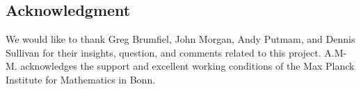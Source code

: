 
\subsection*{Acknowledgment}

We would like to thank Greg Brumfiel, John Morgan, Andy Putmam, and Dennis Sullivan for their insights, question, and comments related to this project.
A.M-M. acknowledges the support and excellent working conditions of the Max Planck Institute for Mathematics in Bonn.